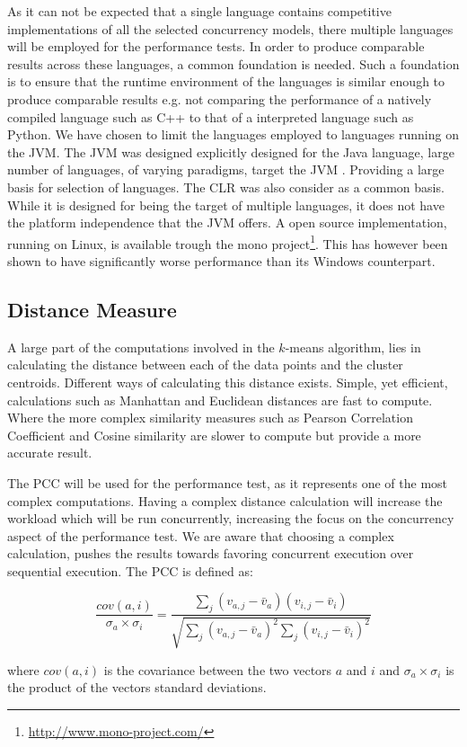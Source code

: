 As it can not be expected that a single language contains competitive implementations of all the selected concurrency models, there multiple languages will be employed for the performance tests. In order to produce comparable results across these languages, a common foundation is needed. Such a foundation is to ensure that the runtime environment of the languages is similar enough to produce comparable results e.g. not comparing the performance of a natively compiled language such as C++ to that of a interpreted language such as Python. We have chosen to limit the languages employed to languages running on the \ac{JVM}. The \ac{JVM} was designed explicitly designed for the Java language, large number of languages, of varying paradigms, target the \ac{JVM} \cite[p. 1]{singer2003jvm}. Providing a large basis for selection of languages. The \ac{CLR} was also consider as a common basis. While it is designed for being the target of multiple languages, it does not have the platform independence that the \ac{JVM} offers. A open source implementation, running on Linux, is available trough the mono project\footnote{\url{http://www.mono-project.com/}}. This has however been shown to have significantly worse performance than its Windows counterpart\cite[p. 59]{totoo2012haskell}.

\subsection{Distance Measure}
A large part of the computations involved in the $k$-means algorithm, lies in calculating the distance between each of the data points and the cluster centroids. Different ways of calculating this distance exists. Simple, yet efficient, calculations such as Manhattan and Euclidean\cite[p. 41]{amatriain2011data} distances are fast to compute. Where the more complex similarity measures such as Pearson Correlation Coefficient and Cosine similarity\cite[p. 42]{amatriain2011data}\cite{breese1998empirical} are slower to compute but provide a more accurate result.

The \ac{PCC} will be used for the performance test, as it represents one of the most complex computations. Having a complex distance calculation will increase the workload which will be run concurrently, increasing the focus on the concurrency aspect of the performance test. We are aware that choosing a complex calculation, pushes the results towards favoring concurrent execution over sequential execution. The \ac{PCC} is defined as:

\begin{equation}\label{pearsonverbose}
\frac{cov(a,i)}{\sigma_a \times \sigma_i} = \frac{\sum_j(v_{a,j}-\bar{v}_a)(v_{i,j}-\bar{v}_i)}{\sqrt{{\sum_j}(v_{a,j}-\bar{v}_a)^2 \sum_j(v_{i,j}-\bar{v}_i)^2}}
\end{equation}

where $cov(a,i)$ is the covariance between the two vectors $a$ and $i$ and $\sigma_a \times \sigma_i$ is the product of the vectors standard deviations.
\worksheetend